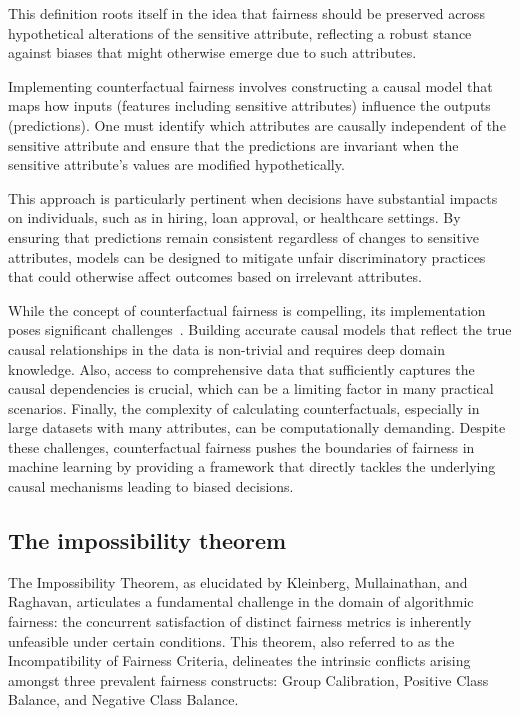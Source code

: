 This definition roots itself in the idea that fairness should be preserved across hypothetical alterations of the sensitive attribute, reflecting a robust stance against biases that might otherwise emerge due to such attributes.

Implementing counterfactual fairness involves constructing a causal model that maps how inputs (features including sensitive attributes) influence the outputs (predictions). One must identify which attributes are causally independent of the sensitive attribute and ensure that the predictions are invariant when the sensitive attribute's values are modified hypothetically.

This approach is particularly pertinent when decisions have substantial impacts on individuals, such as in hiring, loan approval, or healthcare settings. By ensuring that predictions remain consistent regardless of changes to sensitive attributes, models can be designed to mitigate unfair discriminatory practices that could otherwise affect outcomes based on irrelevant attributes.

While the concept of counterfactual fairness is compelling, its implementation poses significant challenges~\cite{Kasirzadeh2021}. Building accurate causal models that reflect the true causal relationships in the data is non-trivial and requires deep domain knowledge. Also, access to comprehensive data that sufficiently captures the causal dependencies is crucial, which can be a limiting factor in many practical scenarios. Finally, the complexity of calculating counterfactuals, especially in large datasets with many attributes, can be computationally demanding. Despite these challenges, counterfactual fairness pushes the boundaries of fairness in machine learning by providing a framework that directly tackles the underlying causal mechanisms leading to biased decisions. 

\subsection{The impossibility theorem}

The Impossibility Theorem, as elucidated by Kleinberg, Mullainathan, and Raghavan, articulates a fundamental challenge in the domain of algorithmic fairness: the concurrent satisfaction of distinct fairness metrics is inherently unfeasible under certain conditions. This theorem, also referred to as the Incompatibility of Fairness Criteria, delineates the intrinsic conflicts arising amongst three prevalent fairness constructs: Group Calibration, Positive Class Balance, and Negative Class Balance.

